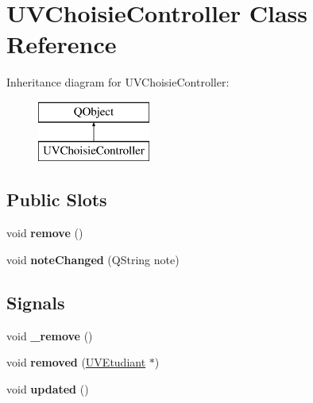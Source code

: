 \hypertarget{classUVChoisieController}{\section{U\+V\+Choisie\+Controller Class Reference}
\label{classUVChoisieController}
}
Inheritance diagram for U\+V\+Choisie\+Controller\+:\begin{figure}[H]
\begin{center}
\leavevmode
\includegraphics[height=2.000000cm]{classUVChoisieController}
\end{center}
\end{figure}
\subsection*{Public Slots}
\begin{DoxyCompactItemize}
\item 
\hypertarget{classUVChoisieController_a708375ad233a6733def4cacc29499a60}{void {\bfseries remove} ()}\label{classUVChoisieController_a708375ad233a6733def4cacc29499a60}

\item 
\hypertarget{classUVChoisieController_ad71f0a3a924a9e5751b0d1dbd13bd5d6}{void {\bfseries note\+Changed} (Q\+String note)}\label{classUVChoisieController_ad71f0a3a924a9e5751b0d1dbd13bd5d6}

\end{DoxyCompactItemize}
\subsection*{Signals}
\begin{DoxyCompactItemize}
\item 
\hypertarget{classUVChoisieController_abd99d85ee5e8ff0fae911b5577d1ee54}{void {\bfseries \+\_\+remove} ()}\label{classUVChoisieController_abd99d85ee5e8ff0fae911b5577d1ee54}

\item 
\hypertarget{classUVChoisieController_a12b646fc9ad01bb316f4cbc98eb8e4a1}{void {\bfseries removed} (\hyperlink{classUVEtudiant}{U\+V\+Etudiant} $\ast$)}\label{classUVChoisieController_a12b646fc9ad01bb316f4cbc98eb8e4a1}

\item 
\hypertarget{classUVChoisieController_a85ae65b9a0c88969439b85f80f36881d}{void {\bfseries updated} ()}\label{classUVChoisieController_a85ae65b9a0c88969439b85f80f36881d}

\end{DoxyCompactItemize}
